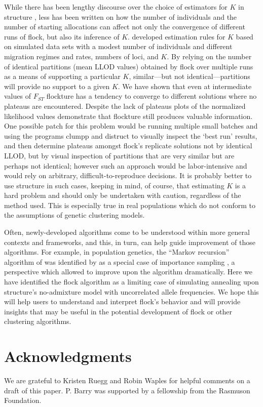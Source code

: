 While there has been lengthy 
discourse over the choice of estimators for $K$ in {\sc structure} 
\citep{Pritchardetal2000,Evannoetal2005,Wap&Gag2006,Gaoetal2011}, less has been written on how the number of 
individuals
and the number of starting allocations can affect not only the convergence of different runs of {\sc flock}, but also its 
inference of $K$. \citeauthor{Duc&Tur2012} developed estimation rules for $K$ based on simulated data 
sets with a modest number of individuals and different migration regimes and rates, numbers of loci, and $K$. 
By relying on the number of identical partitions (mean LLOD values) obtained by {\sc flock} over multiple
runs as a means of supporting 
a particular $K$,  similar---but not identical---partitions
will provide no support to a given $K$. We have shown that even at intermediate
values of $F_{ST}$ {\sc flockture} has a tendency to converge to 
different solutions where no plateaus are encountered. Despite the lack of
plateaus plots of the normalized likelihood values demonstrate that
{\sc flockture} still produces valuable information. One possible patch for this problem would be running
multiple small batches and using the programs {\sc clumpp} \citep{Jak&Ros2007} and
{\sc distruct} \citep{Rosenberg2004} to visually inspect the `best run' results, and then 
determine plateaus amongst {\sc flock}'s replicate solutions not by identical LLOD, but by visual inspection of 
partitions that
are very similar but are perhaps not identical; however such an approach would be labor-intensive
and would rely on arbitrary, difficult-to-reproduce decisions.  It is probably better to use {\sc structure} 
in such cases, keeping in mind, of course, that
estimating $K$ is a hard problem and should only be undertaken with caution, regardless of the method 
used. This is especially true in real populations which do not conform to the assumptions of genetic clustering models.
 
Often, newly-developed algorithms come to be understood within more general contexts and 
frameworks, and this, in turn, can help guide improvement of those algorithms.  For example, in population
genetics, the ``Markov recursion'' algorithm of \citet{Gri&Tav1994-AI} was identified by \citet{Felsensteinetal1999} 
as a special case of importance sampling \citep{Ham&Han1964}, a perspective which allowed 
\citet{Ste&Don2000} to improve upon the algorithm dramatically.  Here we have identified the {\sc flock}
algorithm as a limiting case of simulating annealing upon {\sc structure}'s no-admixture model with uncorrelated
allele frequencies. We hope this will
help users to understand and interpret {\sc flock}'s behavior and will provide insights that may be useful 
in the potential development of {\sc flock} or other clustering algorithms.   


\section*{Acknowledgments}
We are grateful to Kristen Ruegg and Robin Waples for helpful comments on a draft of this paper.
P. Barry was supported by a fellowship from the Rasmuson Foundation.